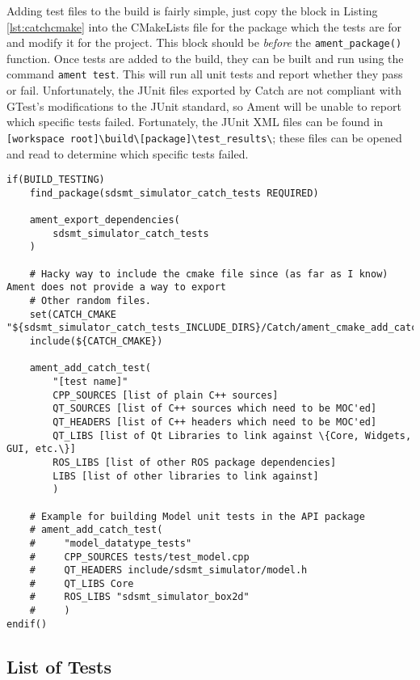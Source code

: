 Adding test files to the build is fairly simple, just copy the block in Listing \ref{lst:catchcmake} into the CMakeLists file for the package which the tests are for and modify it for the project. This block should be \textit{before} the \lstinline|ament_package()| function. Once tests are added to the build, they can be built and run using the command \lstinline|ament test|. This will run all unit tests and report whether they pass or fail. Unfortunately, the JUnit files exported by Catch are not compliant with GTest's modifications to the JUnit standard, so Ament will be unable to report which specific tests failed. Fortunately, the JUnit XML files can be found in \lstinline|[workspace root]\build\[package]\test_results\|; these files can be opened and read to determine which specific tests failed.

\begin{lstlisting}[caption={Example CMake code for adding a Catch test}, label={lst:catchcmake}]
if(BUILD_TESTING)
    find_package(sdsmt_simulator_catch_tests REQUIRED)

    ament_export_dependencies(
        sdsmt_simulator_catch_tests
    )

    # Hacky way to include the cmake file since (as far as I know) Ament does not provide a way to export
    # Other random files.
    set(CATCH_CMAKE "${sdsmt_simulator_catch_tests_INCLUDE_DIRS}/Catch/ament_cmake_add_catch_test.cmake")
    include(${CATCH_CMAKE})

    ament_add_catch_test(
        "[test name]"
        CPP_SOURCES [list of plain C++ sources]
        QT_SOURCES [list of C++ sources which need to be MOC'ed]
        QT_HEADERS [list of C++ headers which need to be MOC'ed]
        QT_LIBS [list of Qt Libraries to link against \{Core, Widgets, GUI, etc.\}]
        ROS_LIBS [list of other ROS package dependencies]
        LIBS [list of other libraries to link against]
        )

    # Example for building Model unit tests in the API package 
    # ament_add_catch_test(
    #     "model_datatype_tests"
    #     CPP_SOURCES tests/test_model.cpp
    #     QT_HEADERS include/sdsmt_simulator/model.h
    #     QT_LIBS Core
    #     ROS_LIBS "sdsmt_simulator_box2d"
    #     )
endif()
\end{lstlisting}

\subsection{List of Tests}
